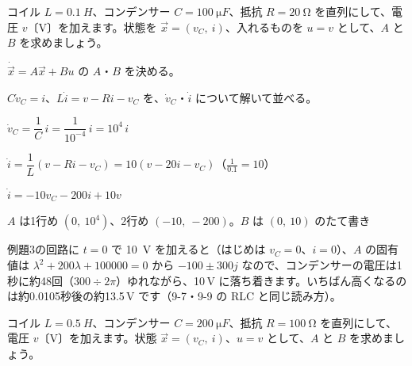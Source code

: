 \begin{reidai}
コイル $L=\qty{0.1}{H}$、コンデンサー $C=\qty{100}{\micro F}$、抵抗 $R=\qty{20}{\ohm}$ を直列にして、電圧 $v$〔V〕を加えます。状態を $\vec x=(v_C,\ i)$、入れるものを $u=v$ として、$A$ と $B$ を求めましょう。\par
\kangaekata {}\par
{}\enspace $\dot{\vec x}=A\vec x+Bu$ の $A$・$B$ を決める。\par
{}\enspace $C\dot v_C=i$、$L\dot i=v-Ri-v_C$ を、$\dot v_C$・$\dot i$ について解いて並べる。\par
\shiki\kixks{}\zw{} $\dot v_C=\dfrac{1}{C}\,i=\dfrac{1}{10^{-4}}\,i=10^4\,i$\par
\kixka $\dot i=\dfrac{1}{L}(v-Ri-v_C)=10(v-20i-v_C)$\quad （$\frac{1}{0.1}=10$）\par
\kixka $\dot i=-10v_C-200i+10v$\par
\kotae $A$ は1行め $(0,\ 10^4)$、2行め $(-10,\ -200)$。$B$ は $(0,\ 10)$ のたて書き
\end{reidai}

例題3の回路に $t=0$ で \qty{10}{V} を加えると（はじめは $v_C=0$、$i=0$）、$A$ の固有値は $\lambda^2+200\lambda+\num{100000}=0$ から $-100\pm300j$ なので、コンデンサーの電圧は1秒に約48回（$300\div2\pi$）ゆれながら、10\,V に落ち着きます。いちばん高くなるのは約0.0105秒後の約13.5\,V です（9-7・9-9 の RLC と同じ読み方）。

\begin{jibun}
コイル $L=\qty{0.5}{H}$、コンデンサー $C=\qty{200}{\micro F}$、抵抗 $R=\qty{100}{\ohm}$ を直列にして、電圧 $v$〔V〕を加えます。状態 $\vec x=(v_C,\ i)$、$u=v$ として、$A$ と $B$ を求めましょう。
\end{jibun}

